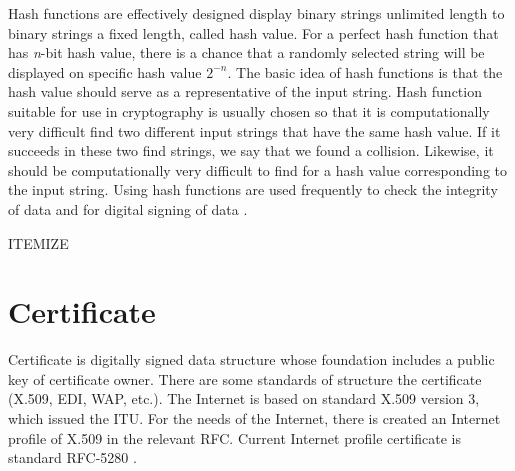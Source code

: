 \documentclass[
  digital, %
  notable,   %
  lof,     %
  lot,     %
]{fithesis3}
\begin{document}
Hash functions are effectively designed display binary strings unlimited length to binary 
strings a fixed length, called hash value. For a perfect hash function that has \textit{n}-bit 
hash value, there is a chance that a randomly selected string will be displayed on specific 
hash value $2^{-n}$. The basic idea of hash functions is that the hash value should serve as a 
representative of the input string. Hash function suitable for use in cryptography is usually 
chosen so that it is computationally very difficult find two different input strings that have 
the same hash value. If it succeeds in these two find strings, we say that we found a 
collision. 
Likewise, it should be computationally very difficult to find for a hash value corresponding 
to the input string. Using hash functions are used frequently to check the integrity of data 
and for digital signing of data \cite{piper2006kryptografie}.

ITEMIZE

\section{Certificate}
Certificate is digitally signed data structure whose foundation includes a public key of
certificate owner. There are some standards of structure the certificate (X.509, EDI, WAP, 
etc.). The Internet is based on standard X.509 version 3, which issued the ITU. For the needs 
of the Internet, there is created an Internet profile of X.509 in the relevant RFC. Current 
Internet profile certificate is standard RFC-5280 \cite{dostalek2016velky}.
\end{document}
